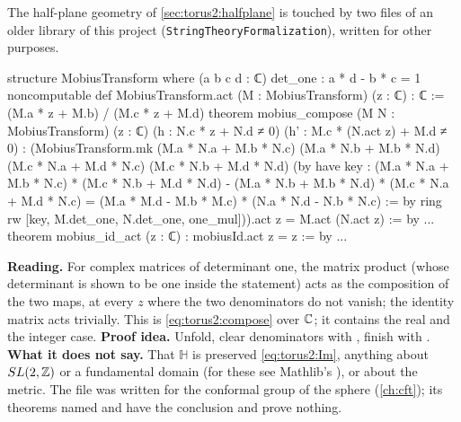 The half-plane geometry of \cref{sec:torus2:halfplane} is touched by two files of an older library of this project
(\texttt{StringTheoryFormalization}), written for other purposes.

\begin{leanbox}
\begin{leancode}
structure MobiusTransform where
  (a b c d : ℂ)
  det_one : a * d - b * c = 1
noncomputable def MobiusTransform.act (M : MobiusTransform) (z : ℂ) : ℂ :=
  (M.a * z + M.b) / (M.c * z + M.d)
theorem mobius_compose (M N : MobiusTransform) (z : ℂ)
    (h : N.c * z + N.d ≠ 0)
    (h' : M.c * (N.act z) + M.d ≠ 0) :
    (MobiusTransform.mk
      (M.a * N.a + M.b * N.c)
      (M.a * N.b + M.b * N.d)
      (M.c * N.a + M.d * N.c)
      (M.c * N.b + M.d * N.d)
      (by
        have key : (M.a * N.a + M.b * N.c) * (M.c * N.b + M.d * N.d)
            - (M.a * N.b + M.b * N.d) * (M.c * N.a + M.d * N.c)
            = (M.a * M.d - M.b * M.c) * (N.a * N.d - N.b * N.c) := by ring
        rw [key, M.det_one, N.det_one, one_mul])).act z =
    M.act (N.act z) := by ...
theorem mobius_id_act (z : ℂ) : mobiusId.act z = z := by ...
\end{leancode}
\textbf{Reading.} For complex matrices of determinant one, the matrix product (whose
determinant is shown to be one inside the statement) acts as the composition of the two
maps, at every $z$ where the two denominators do not vanish; the identity matrix acts
trivially. This is \eqref{eq:torus2:compose} over $\mathbb{C}$; it contains the real and the integer
case. \textbf{Proof idea.} Unfold, clear denominators with , finish with
. \textbf{What it does not say.} That $\mathbb H$ is preserved
\eqref{eq:torus2:Im}, anything about $SL(2,\mathbb{Z})$ or a fundamental domain (for these see Mathlib's
), or about the metric. The file was written for the conformal group of
the sphere (\cref{ch:cft}); its theorems named  and
 have the conclusion  and prove nothing.
\end{leanbox}

